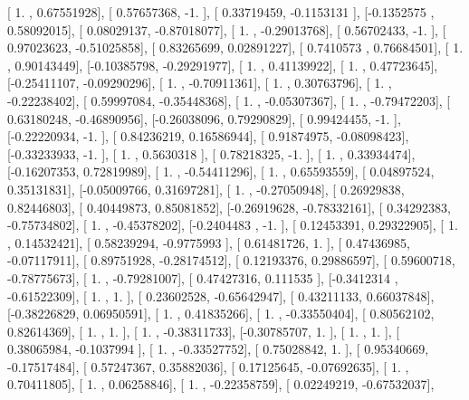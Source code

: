 \documentclass{article}
\begin{document}
       [ 1.        ,  0.67551928],
       [ 0.57657368, -1.        ],
       [ 0.33719459, -0.1153131 ],
       [-0.1352575 ,  0.58092015],
       [ 0.08029137, -0.87018077],
       [ 1.        , -0.29013768],
       [ 0.56702433, -1.        ],
       [ 0.97023623, -0.51025858],
       [ 0.83265699,  0.02891227],
       [ 0.7410573 ,  0.76684501],
       [ 1.        ,  0.90143449],
       [-0.10385798, -0.29291977],
       [ 1.        ,  0.41139922],
       [ 1.        ,  0.47723645],
       [-0.25411107, -0.09290296],
       [ 1.        , -0.70911361],
       [ 1.        ,  0.30763796],
       [ 1.        , -0.22238402],
       [ 0.59997084, -0.35448368],
       [ 1.        , -0.05307367],
       [ 1.        , -0.79472203],
       [ 0.63180248, -0.46890956],
       [-0.26038096,  0.79290829],
       [ 0.99424455, -1.        ],
       [-0.22220934, -1.        ],
       [ 0.84236219,  0.16586944],
       [ 0.91874975, -0.08098423],
       [-0.33233933, -1.        ],
       [ 1.        ,  0.5630318 ],
       [ 0.78218325, -1.        ],
       [ 1.        ,  0.33934474],
       [-0.16207353,  0.72819989],
       [ 1.        , -0.54411296],
       [ 1.        ,  0.65593559],
       [ 0.04897524,  0.35131831],
       [-0.05009766,  0.31697281],
       [ 1.        , -0.27050948],
       [ 0.26929838,  0.82446803],
       [ 0.40449873,  0.85081852],
       [-0.26919628, -0.78332161],
       [ 0.34292383, -0.75734802],
       [ 1.        , -0.45378202],
       [-0.2404483 , -1.        ],
       [ 0.12453391,  0.29322905],
       [ 1.        ,  0.14532421],
       [ 0.58239294, -0.9775993 ],
       [ 0.61481726,  1.        ],
       [ 0.47436985, -0.07117911],
       [ 0.89751928, -0.28174512],
       [ 0.12193376,  0.29886597],
       [ 0.59600718, -0.78775673],
       [ 1.        , -0.79281007],
       [ 0.47427316,  0.111535  ],
       [-0.3412314 , -0.61522309],
       [ 1.        ,  1.        ],
       [ 0.23602528, -0.65642947],
       [ 0.43211133,  0.66037848],
       [-0.38226829,  0.06950591],
       [ 1.        ,  0.41835266],
       [ 1.        , -0.33550404],
       [ 0.80562102,  0.82614369],
       [ 1.        ,  1.        ],
       [ 1.        , -0.38311733],
       [-0.30785707,  1.        ],
       [ 1.        ,  1.        ],
       [ 0.38065984, -0.1037994 ],
       [ 1.        , -0.33527752],
       [ 0.75028842,  1.        ],
       [ 0.95340669, -0.17517484],
       [ 0.57247367,  0.35882036],
       [ 0.17125645, -0.07692635],
       [ 1.        ,  0.70411805],
       [ 1.        ,  0.06258846],
       [ 1.        , -0.22358759],
       [ 0.02249219, -0.67532037],
\end{document}
